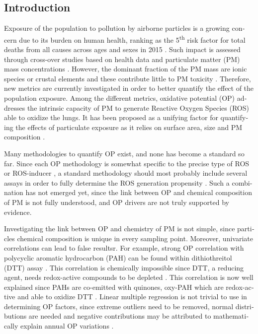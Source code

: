 \begin{otherlanguage}{english}
\section{Introduction}  %
Exposure of the population to pollution by airborne particles is a growing
concern due to its burden on human health, ranking as the 5\textsuperscript{th}
risk factor for total deaths from all causes across ages and sexes in 2015
\parencite{cohenEstimates2017}. Such impact is assessed through cross-over studies
based on health data and particulate matter (PM) mass concentrations
\parencite{popeiiiAir2004,popeiiiEpidemiology1999,worldhealthorganizationAmbient2016}. However,
the dominant fraction of the PM mass are ionic species or crustal elements and
these contribute little to PM toxicity \parencite{ayresEvaluating2008}.
Therefore, new metrics are currently investigated in order to better quantify
the effect of the population exposure. Among the different metrics, oxidative
potential (OP) addresses the intrinsic capacity of PM to generate Reactive
Oxygen Species (ROS) able to oxidize the lungs. It has been proposed as a
unifying factor for quantifying the effects of particulate exposure as it relies
on surface area, size and PM composition
\parencite{ayresEvaluating2008,sauvainDifferentiated2009,kellySize2012,gehlingEnvironmentally2013,sauvainComparison2013,fangOxidative2016,crobedduOxidative2017,abramsAssociations2017}.

Many methodologies to quantify OP exist, and none has become a standard so far.
Since each OP methodology is somewhat specific to the precise type of ROS or
ROS-inducer \parencite{yangMeasurement2014}, a standard methodology should most
probably include several assays in order to fully determine the ROS generation
propensity \parencite{janssenAssociations2015,sauvainComparison2013}. Such a
combination has not emerged yet, since the link between OP and chemical
composition of PM is not fully understood, and OP drivers are not truly
supported by evidence.

Investigating the link between OP and chemistry of PM is not simple, since
particles chemical composition is unique in every sampling point.  Moreover,
univariate correlations can lead to false resultsr. For example, strong OP
correlation with polycyclic aromatic hydrocarbon (PAH) can be found within
dithiothreitol (DTT) assay \parencite{calasComparison2018}. This correlation is
chemically impossible since DTT, a reducing agent, needs redox-active compounds
to be depleted \parencite{ntziachristosRelationship2007,shirmohammadiFine2016}.
This correlation is now well explained since PAHs are co-emitted with quinones,
oxy-PAH which are redox-active and able to oxidize DTT
\parencite{charrierOxidant2015,charrierDithiothreitol2012}. Linear multiple
regression is not trivial to use in determining OP factors, since extreme
outliers need to be removed, normal distributions are needed and negative
contributions may be attributed to mathematically explain annual OP variations
\parencite{calasComparison2018}.


\end{otherlanguage}
